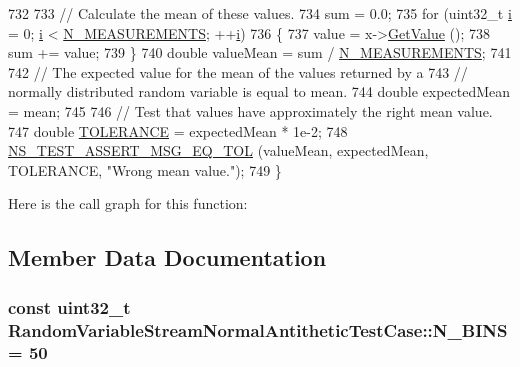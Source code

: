 \begin{DoxyCode}
732 
733   \textcolor{comment}{// Calculate the mean of these values.}
734   sum = 0.0;
735   \textcolor{keywordflow}{for} (uint32\_t \hyperlink{bernuolliDistribution_8m_a6f6ccfcf58b31cb6412107d9d5281426}{i} = 0; \hyperlink{bernuolliDistribution_8m_a6f6ccfcf58b31cb6412107d9d5281426}{i} < \hyperlink{classRandomVariableStreamNormalAntitheticTestCase_a2af883acc639d6f19843c57a174c0349}{N\_MEASUREMENTS}; ++\hyperlink{bernuolliDistribution_8m_a6f6ccfcf58b31cb6412107d9d5281426}{i})
736     \{
737       value = x->\hyperlink{classns3_1_1NormalRandomVariable_a0134d131477bc439cc6ff7cbe84b03a9}{GetValue} ();
738       sum += value;
739     \}
740   \textcolor{keywordtype}{double} valueMean = sum / \hyperlink{classRandomVariableStreamNormalAntitheticTestCase_a2af883acc639d6f19843c57a174c0349}{N\_MEASUREMENTS};
741 
742   \textcolor{comment}{// The expected value for the mean of the values returned by a}
743   \textcolor{comment}{// normally distributed random variable is equal to mean.}
744   \textcolor{keywordtype}{double} expectedMean = mean;
745 
746   \textcolor{comment}{// Test that values have approximately the right mean value.}
747   \textcolor{keywordtype}{double} \hyperlink{spectrum-value-test_8cc_a30c17564229ec2e37dfea9c6c9ad643e}{TOLERANCE} = expectedMean * 1e-2;
748   \hyperlink{group__testing_ga9e7861b56b4e70db3b56044cb7a28e41}{NS\_TEST\_ASSERT\_MSG\_EQ\_TOL} (valueMean, expectedMean, TOLERANCE, \textcolor{stringliteral}{"Wrong mean
       value."}); 
749 \}
\end{DoxyCode}


Here is the call graph for this function\+:




\subsection{Member Data Documentation}
\subsubsection[{\texorpdfstring{N\+\_\+\+B\+I\+NS}{N_BINS}}]{\setlength{\rightskip}{0pt plus 5cm}const uint32\+\_\+t Random\+Variable\+Stream\+Normal\+Antithetic\+Test\+Case\+::\+N\+\_\+\+B\+I\+NS = 50\hspace{0.3cm}{\ttfamily [static]}}\hypertarget{classRandomVariableStreamNormalAntitheticTestCase_a8e535b2fdb6a3f59c0abc6b61998a657}{}\label{classRandomVariableStreamNormalAntitheticTestCase_a8e535b2fdb6a3f59c0abc6b61998a657}
